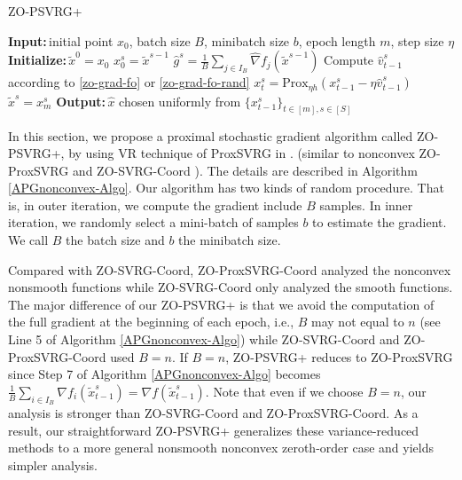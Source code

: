 \documentclass{article}
\newcommand*{\Po}{\text{Prox}}
\newcommand{\Initialize}{\textbf{Initialize:}{\,}}
\newcommand{\Input}{\textbf{Input:}{\,}}
\newcommand{\Output}{\textbf{Output:}{\,}}
\theoremstyle{definition}
\theoremstyle{remark}
\begin{document}
\begin{algorithm}\label{APGnonconvex-Algo}
\caption{ZO-PSVRG+}
\begin{algorithmic}[1]
\State\Input initial point $x_0$, batch size $B$, minibatch size $b$, epoch length $m$, step size $\eta$
\State\Initialize $\tilde{x}^0 = x_0$
\State $x_0^s = \tilde{x}^{s-1}$
\State $\hat{g}^s = \frac{1}{B} \sum_{j\in I_B} \hat{\nabla} f_j (\tilde{x}^{s-1})$
\State Compute ${\hat{v}}_{t-1}^s$ according to \eqref{zo-grad-fo} or \eqref{zo-grad-fo-rand}
\State $x_{t}^s= \Po_{\eta h}(x_{t-1}^s - \eta \hat{v}_{t-1}^s)$
\EndFor
\State $\tilde{x}^{s} = x_m^s$
 \EndFor
 \State\Output $\hat{x}$ chosen uniformly from $\{x_{t-1}^s\}_{t\in [m], s\in [S]}$
\end{algorithmic}
\end{algorithm}
{\color{Violet}
In this section, we propose a proximal stochastic gradient algorithm called ZO-PSVRG+, by using VR technique of ProxSVRG in \cite{xiao2014proximal,reddi2016proximal,li2018simple}.
(similar to nonconvex ZO-ProxSVRG \cite{huang2019faster} and ZO-SVRG-Coord \cite{liu2018zeroth}). The details
are described in Algorithm \ref{APGnonconvex-Algo}.
{\color{Brown}
Our algorithm has two kinds of random procedure. That is, in outer iteration,
we compute the gradient include $B$ samples. In inner iteration, we randomly select a mini-batch of samples $b$ to estimate the gradient.}
 We call $B$ the batch size and $b$ the minibatch size.

Compared with ZO-SVRG-Coord, ZO-ProxSVRG-Coord analyzed the nonconvex nonsmooth functions while ZO-SVRG-Coord only analyzed the smooth functions. The major difference of our ZO-PSVRG+ is that
we avoid the computation of the full gradient at the beginning of each epoch, i.e., $B$ may not equal to $n$ (see Line 5 of Algorithm \ref{APGnonconvex-Algo}) while ZO-SVRG-Coord and ZO-ProxSVRG-Coord used $B = n$. 
{\color{Brown}
If $B = n$, ZO-PSVRG+ reduces to ZO-ProxSVRG  since Step 7 of Algorithm \ref{APGnonconvex-Algo} becomes
$\frac{1}{B}\sum_{i\in I_B} \nabla f_i(\tilde{x}^s_{t-1}) = \nabla f(\tilde{x}^s_{t-1})$. }
Note that even if we choose $B = n$, our analysis is
stronger than ZO-SVRG-Coord and ZO-ProxSVRG-Coord. As a result, our straightforward ZO-PSVRG+ generalizes these variance-reduced methods to a more general nonsmooth nonconvex zeroth-order case and yields simpler analysis.
}
\end{document}
